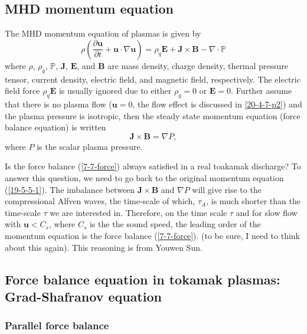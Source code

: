 \documentclass{article}
\begin{document}
\subsection{MHD momentum equation}

The MHD momentum equation of plasmas is given by
\begin{equation}
  \label{19-5-5-1} \rho \left( \frac{\partial \mathbf{u}}{\partial t}
  +\mathbf{u} \cdot \nabla \mathbf{u} \right) = \rho_q \mathbf{E}+\mathbf{J}
  \times \mathbf{B}- \nabla \cdot \mathbb{P}
\end{equation}
where $\rho$, $\rho_q$, $\mathbb{P}$, $\mathbf{J}$, $\mathbf{E}$, and
$\mathbf{B}$ are mass density, charge density, thermal pressure tensor,
current density, electric field, and magnetic field, respectively. The
electric field force $\rho_q \mathbf{E}$ is usually ignored due to either
$\rho_q = 0$ or $\mathbf{E}= 0$. Further assume that there is no plasma flow
($\mathbf{u}= 0$, the flow effect is discussed in \ref{20-4-7-p2}) and the
plasma pressure is isotropic, then the steady state momentum equation (force
balance equation) is written
\begin{equation}
  \label{7-7-force} \mathbf{J} \times \mathbf{B}= \nabla P,
\end{equation}
where $P$ is the scalar plasma pressure.

Is the force balance (\ref{7-7-force}) always satisfied in a real toakamak
discharge? To answer this question, we need to go back to the original
momentum equation (\ref{19-5-5-1}). The imbalance between $\mathbf{J} \times
\mathbf{B}$ and $\nabla P$ will give rise to the compressional Alfven waves,
the time-scale of which, $\tau_A$, is much shorter than the time-scale $\tau$
we are interested in. Therefore, on the time scale $\tau$ and for slow flow
with $\mathbf{u}< C_s$, where $C_s$ is the the sound speed, the leading order
of the momentum equation is the force balance (\ref{7-7-force}). (to be sure,
I need to think about this again). This reasoning is from Youwen
Sun{\cite{ysun2012}}.

\subsection{\label{3-14-p1}Force balance equation in tokamak plasmas:
Grad-Shafranov equation}

\subsubsection{Parallel force balance }
\end{document}
